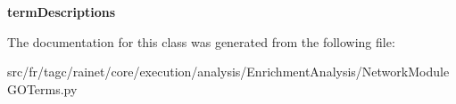 \begin{DoxyCompactItemize}
\item 
\hypertarget{classsrc_1_1fr_1_1tagc_1_1rainet_1_1core_1_1execution_1_1analysis_1_1EnrichmentAnalysis_1_1Netwocd24f37753b2377449d55719611022ad_ac96a935c2a4c9d1a7b11eca75beac3e3}{{\bfseries term\-Descriptions}}\label{classsrc_1_1fr_1_1tagc_1_1rainet_1_1core_1_1execution_1_1analysis_1_1EnrichmentAnalysis_1_1Netwocd24f37753b2377449d55719611022ad_ac96a935c2a4c9d1a7b11eca75beac3e3}

\end{DoxyCompactItemize}


The documentation for this class was generated from the following file\-:\begin{DoxyCompactItemize}
\item 
src/fr/tagc/rainet/core/execution/analysis/\-Enrichment\-Analysis/Network\-Module\-G\-O\-Terms.\-py\end{DoxyCompactItemize}
